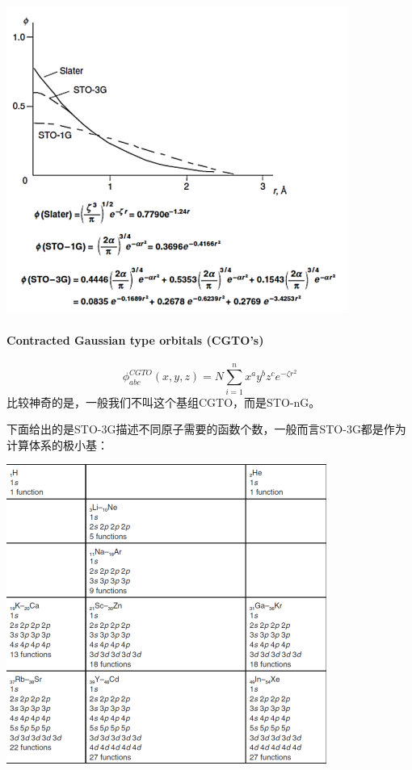 \begin{center}
    \includegraphics{fig/lzhx/微信图片_20211102165150}
\end{center}

\paragraph*{Contracted Gaussian type orbitals (CGTO's)}
\[\phi_{abc}^{CGTO}(x,y,z)=N\sum_{i=1}^n x^ay^bz^ce^{-\zeta r^2}\]
比较神奇的是，一般我们不叫这个基组CGTO，而是STO-nG。

下面给出的是STO-3G描述不同原子需要的函数个数，一般而言STO-3G都是作为计算体系的极小基：
\begin{center}
    \includegraphics[scale=0.7]{fig/lzhx/微信图片_20211102171332.png}
\end{center}

